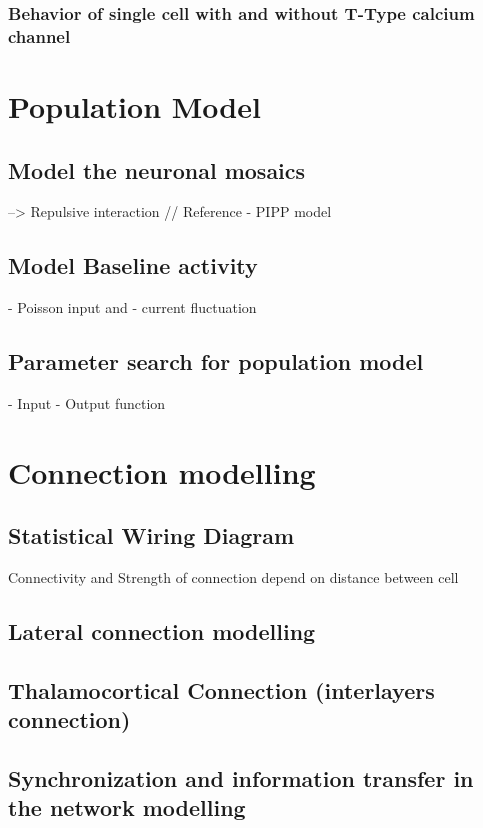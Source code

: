 \subsubsection{Behavior of single cell with and without T-Type calcium channel}


\section{Population Model}
\subsection{Model the neuronal mosaics}
 --> Repulsive interaction  // Reference - PIPP model 
 \subsection{Model Baseline activity}
 - Poisson input 
 and 
 - current fluctuation 
 \subsection{Parameter search for population model}
 -  Input - Output function

\section{Connection modelling }

\subsection{Statistical Wiring Diagram}
Connectivity and  Strength of connection depend on distance between cell\cite{ringach2004haphazard,mclaughlin2000neuronal}
\cite{mclaughlin2000neuronal}

\subsection{Lateral connection modelling}


\subsection{Thalamocortical Connection (interlayers connection)}


\subsection{Synchronization and information transfer in the network modelling}


